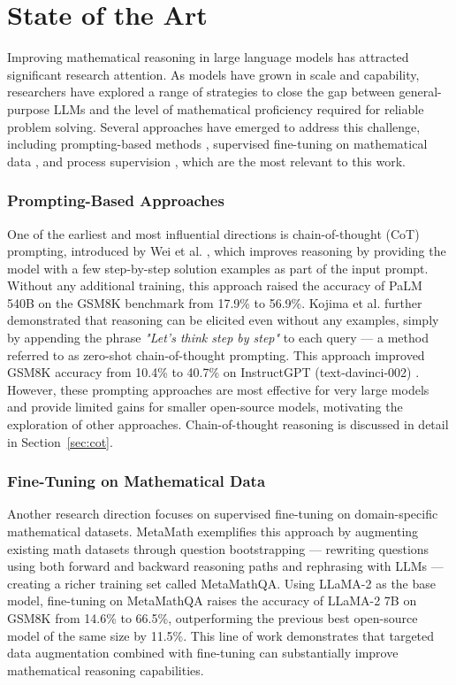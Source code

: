 \section{State of the Art}
\label{sec:sota}
Improving mathematical reasoning in large language models
  has attracted significant research attention. As models
  have grown in scale and capability, researchers have
  explored a range of strategies to close the gap between
  general-purpose LLMs and the level of mathematical
  proficiency required for reliable problem solving. Several
  approaches have emerged to address this challenge,
  including prompting-based methods \cite{wei2023}, supervised fine-tuning
  on mathematical data \cite{yu2024}, and process supervision
  \cite{lightman2024,qwen2025prm}, which are
  the most relevant to this work.

  \subsubsection*{Prompting-Based Approaches}

  One of the earliest and most influential directions is
  chain-of-thought (CoT) prompting, introduced by Wei et al.
  \cite{wei2023}, which improves reasoning by providing the
  model with a few step-by-step solution examples as part of
  the input prompt. Without any additional training, this
  approach raised the accuracy of PaLM 540B on the GSM8K
  benchmark from 17.9\% to 56.9\%. Kojima et al.
  \cite{kojima2022} further demonstrated that reasoning can
  be elicited even without any examples, simply by appending
  the phrase \textit{"Let's think step by step"} to each
  query --- a method referred to as zero-shot chain-of-thought
  prompting. This approach improved GSM8K accuracy from 10.4\% to
  40.7\% on InstructGPT (text-davinci-002) \cite{kojima2022}.
  However, these prompting approaches are most effective
  for very large models and provide limited gains for
  smaller open-source models, motivating the exploration
  of other approaches. Chain-of-thought reasoning is discussed in detail
  in Section~\ref{sec:cot}.

  \subsubsection*{Fine-Tuning on Mathematical Data}
  Another research direction focuses on supervised
  fine-tuning on domain-specific mathematical datasets.
  MetaMath \cite{yu2024} exemplifies this approach by
  augmenting existing math datasets through question
  bootstrapping --- rewriting questions using both forward
  and backward reasoning paths and rephrasing with LLMs
  --- creating a richer training set called MetaMathQA.
  Using LLaMA-2 as the base model, fine-tuning on
  MetaMathQA raises the accuracy of LLaMA-2 7B on GSM8K
  from 14.6\% to 66.5\%, outperforming the previous best
  open-source model of the same size by 11.5\%. This line
  of work demonstrates that targeted data augmentation
  combined with fine-tuning can substantially improve
  mathematical reasoning capabilities.

